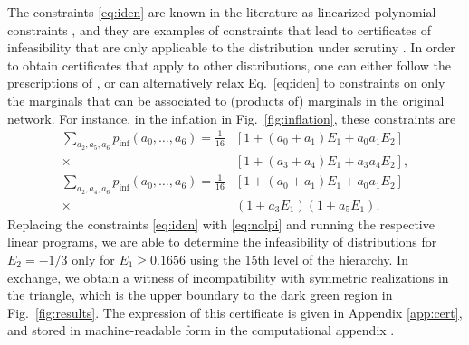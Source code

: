 \documentclass[aps,physrev,reprint,superscriptaddress,nofootinbib,twocolumn]{revtex4-2}
\begin{document}
The constraints \eqref{eq:iden} are known in the literature as linearized polynomial constraints \cite{pozas2022b,alexthesis}, and they are examples of constraints that lead to certificates of infeasibility that are only applicable to the distribution under scrutiny \cite{pozas2022b}.
In order to obtain certificates that apply to other distributions, one can either follow the prescriptions of \cite{pozas2022b}, or can alternatively relax Eq.~\eqref{eq:iden} to constraints on only the marginals that can be associated to (products of) marginals in the original network.
For instance, in the inflation in Fig.~\ref{fig:inflation}, these constraints are
\begin{equation}
    \begin{aligned}
        \sum_{a_2,a_5,a_6}\!\! p_\text{inf}(a_0,\dots,a_6)=\frac{1}{16} &\left[1+(a_0+a_1)E_1+a_0a_1E_2\right]\\
        \times&\left[1+(a_3+a_4)E_1+a_3a_4E_2\right],\\
        \sum_{a_2,a_4,a_6}\!\! p_\text{inf}(a_0,\dots,a_6) =\frac{1}{16} &\left[1+(a_0+a_1)E_1+a_0a_1E_2\right]\\
        \times&\left(1+a_3E_1\right)\left(1+a_5E_1\right).
    \end{aligned}
    \label{eq:nolpi}
\end{equation}
Replacing the constraints \eqref{eq:iden} with \eqref{eq:nolpi} and running the respective linear programs, we are able to determine the infeasibility of distributions for $E_2=-1/3$ only for $E_1\geq0.1656$ using the 15th level of the hierarchy.
In exchange, we obtain a witness of incompatibility with symmetric realizations in the triangle, which is the upper boundary to the dark green region in Fig.~\ref{fig:results}.
The expression of this certificate is given in Appendix \ref{app:cert}, and stored in machine-readable form in the computational appendix \cite{compapp}.
\end{document}
